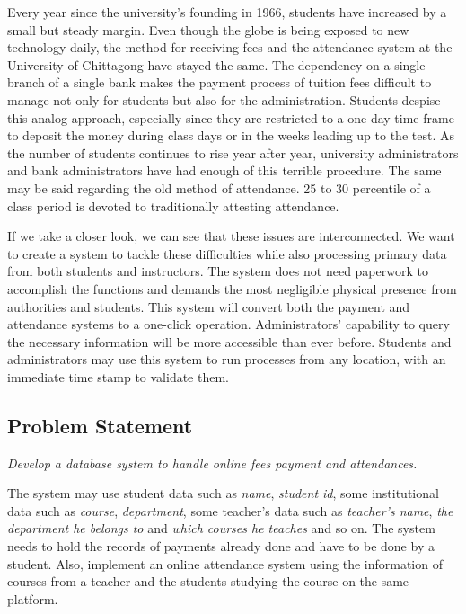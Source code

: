 Every year since the university’s founding in 1966, students have increased by a small but steady margin. Even though the globe is being exposed to new technology daily, the method for receiving fees and the attendance system at the University of Chittagong have stayed the same. The dependency on a single branch of a single bank makes the payment process of tuition fees difficult to manage not only for students but also for the administration. Students despise this analog approach, especially since they are restricted to a one-day time frame to deposit the money during class days or in the weeks leading up to the test. As the number of students continues to rise year after year, university administrators and bank administrators have had enough of this terrible procedure. The same may be said regarding the old method of attendance. 25 to 30 percentile of a class period is devoted to traditionally attesting attendance.

If we take a closer look, we can see that these issues are interconnected. We want to create a system to tackle these difficulties while also processing primary data from both students and instructors. The system does not need paperwork to accomplish the functions and demands the most negligible physical presence from authorities and students. This system will convert both the payment and attendance systems to a one-click operation. Administrators' capability to query the necessary information will be more accessible than ever before. Students and administrators may use this system to run processes from any location, with an immediate time stamp to validate them.

\subsection{Problem Statement}\label{subsec:ps} 

\emph{Develop a database system to handle online fees payment and attendances.}

The system may use student data such as \emph{name}, \emph{student id}, some institutional data such as \emph{course}, \emph{department}, some teacher's data such as \emph{teacher's name}, \emph{the department he belongs to} and \emph{which courses he teaches} and so on. The system needs to hold the records of payments already done and have to be done by a student. Also, implement an online attendance system using the information of courses from a teacher and the students studying the course on the same platform.

